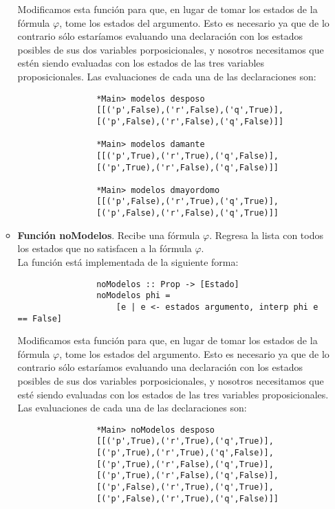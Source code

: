 \documentclass[letterpaper,12pt]{article}
\begin{document}
\begin{itemize}
\begin{itemize}
            Modificamos esta función para que, en lugar de tomar los estados de 
            la fórmula $\varphi$, tome los estados del argumento. Esto es 
            necesario ya que de lo contrario sólo estaríamos evaluando una 
            declaración con los estados posibles de sus dos variables 
            porposicionales, y nosotros necesitamos que estén siendo evaluadas
            con los estados de las tres variables proposicionales.
            Las evaluaciones de cada una de las declaraciones son:
            \begin{lstlisting}
                *Main> modelos desposo
                [[('p',False),('r',False),('q',True)],
                [('p',False),('r',False),('q',False)]]
                
                *Main> modelos damante
                [[('p',True),('r',True),('q',False)],
                [('p',True),('r',False),('q',False)]]
                
                *Main> modelos dmayordomo
                [[('p',False),('r',True),('q',True)],
                [('p',False),('r',False),('q',True)]]
            \end{lstlisting}

            \item \textbf{Función noModelos}. Recibe una fórmula $\varphi$.
            Regresa la lista con todos los estados que no satisfacen a la 
            fórmula $\varphi$. \\
            La función está implementada de la siguiente forma:
            \begin{lstlisting}
                noModelos :: Prop -> [Estado]
                noModelos phi = 
                    [e | e <- estados argumento, interp phi e == False]
            \end{lstlisting}

            Modificamos esta función para que, en lugar de tomar los estados de
            la fórmula $\varphi$, tome los estados del argumento.  Esto es 
            necesario ya que de lo contrario sólo estaríamos evaluando una 
            declaración con los estados posibles de sus dos variables 
            porposicionales, y nosotros necesitamos que esté siendo 
            evaluadas con los estados de las tres variables proposicionales.
            Las evaluaciones de cada una de las declaraciones son: 
            \begin{lstlisting}
                *Main> noModelos desposo
                [[('p',True),('r',True),('q',True)],
                [('p',True),('r',True),('q',False)],
                [('p',True),('r',False),('q',True)],
                [('p',True),('r',False),('q',False)],
                [('p',False),('r',True),('q',True)],
                [('p',False),('r',True),('q',False)]]
                

\end{lstlisting}
\end{itemize}
\end{itemize}
\end{document}
